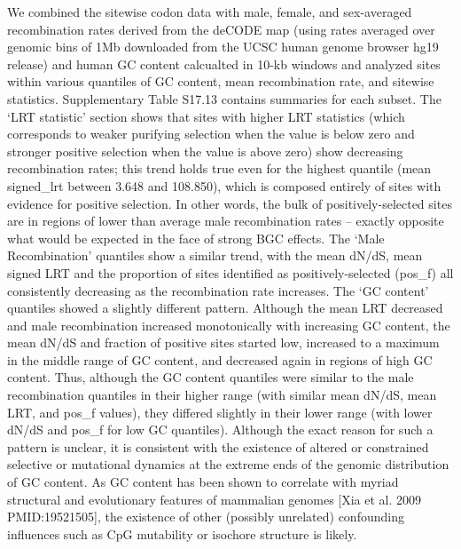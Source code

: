 We combined the sitewise codon data with male, female, and
sex-averaged recombination rates derived from the deCODE map (using
rates averaged over genomic bins of 1Mb downloaded from the UCSC human
genome browser hg19 release) and human GC content calcualted in 10-kb
windows and analyzed sites within various quantiles of GC content,
mean recombination rate, and sitewise statistics. Supplementary Table
S17.13 contains summaries for each subset. The ‘LRT statistic’ section
shows that sites with higher LRT statistics (which corresponds to
weaker purifying selection when the value is below zero and stronger
positive selection when the value is above zero) show decreasing
recombination rates; this trend holds true even for the highest
quantile (mean signed\_lrt between 3.648 and 108.850), which is
composed entirely of sites with evidence for positive selection. In
other words, the bulk of positively-selected sites are in regions of
lower than average male recombination rates -- exactly opposite what
would be expected in the face of strong BGC effects. The ‘Male
Recombination’ quantiles show a similar trend, with the mean dN/dS,
mean signed LRT and the proportion of sites identified as
positively-selected (pos\_f) all consistently decreasing as the
recombination rate increases. The ‘GC content’ quantiles showed a
slightly different pattern. Although the mean LRT decreased and male
recombination increased monotonically with increasing GC content, the
mean dN/dS and fraction of positive sites started low, increased to a
maximum in the middle range of GC content, and decreased again in
regions of high GC content. Thus, although the GC content quantiles
were similar to the male recombination quantiles in their higher range
(with similar mean dN/dS, mean LRT, and pos\_f values), they differed
slightly in their lower range (with lower dN/dS and pos\_f for low GC
quantiles). Although the exact reason for such a pattern is unclear,
it is consistent with the existence of altered or constrained
selective or mutational dynamics at the extreme ends of the genomic
distribution of GC content. As GC content has been shown to correlate
with myriad structural and evolutionary features of mammalian genomes
[Xia et al. 2009 PMID:19521505], the existence of other (possibly
unrelated) confounding influences such as CpG mutability or isochore
structure is likely.

